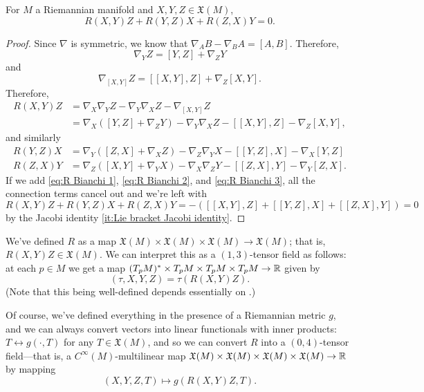 \begin{proposition}\label{prop:Bianchi identity}
	For $M$ a Riemannian manifold and $X,Y,Z \in \mathfrak{X}(M)$,
	\[
		R(X,Y)Z + R(Y,Z)X + R(Z,X)Y = 0.
	\]
\end{proposition}

\begin{proof}
	Since $\nabla$ is symmetric, we know that $\nabla_AB - \nabla_B A = [A,B]$. Therefore, 
	\[
		\nabla_YZ = [Y,Z] + \nabla_ZY
	\]
	and
	\[
		\nabla_{[X,Y]}Z = [[X,Y],Z] + \nabla_Z[X,Y].
	\]
	Therefore,
	\begin{align}\label{eq:R Bianchi 1}
		R(X,Y)Z & = \nabla_X \nabla_Y Z - \nabla_Y \nabla_X Z - \nabla_{[X,Y]}Z \nonumber\\
		& = \nabla_X([Y,Z] + \nabla_ZY) - \nabla_Y \nabla_XZ - [[X,Y],Z] - \nabla_Z[X,Y],
	\end{align}
	and similarly
	\begin{align}
		R(Y,Z)X & = \nabla_Y([Z,X] + \nabla_XZ) - \nabla_Z \nabla_YX - [[Y,Z],X] - \nabla_X[Y,Z] \label{eq:R Bianchi 2} \\
		R(Z,X)Y & = \nabla_Z([X,Y] + \nabla_YX) - \nabla_X \nabla_ZY - [[Z,X],Y] - \nabla_Y[Z,X]. \label{eq:R Bianchi 3}
	\end{align}
	If we add \eqref{eq:R Bianchi 1}, \eqref{eq:R Bianchi 2}, and \eqref{eq:R Bianchi 3}, all the connection terms cancel out and we're left with
	\[
		R(X,Y)Z + R(Y,Z)X + R(Z,X)Y = -([[X,Y],Z] + [[Y,Z],X] + [[Z,X],Y]) = 0
	\]
	by the Jacobi identity \ref{it:Lie bracket Jacobi identity}.
\end{proof}

We've defined $R$ as a map $\mathfrak{X}(M) \times \mathfrak{X}(M) \times \mathfrak{X}(M) \to \mathfrak{X}(M)$; that is, $R(X,Y)Z \in \mathfrak{X}(M)$. We can interpret this as a $(1,3)$-tensor field as follows: at each $p \in M$ we get a map $(T_pM)^\ast \times T_pM \times T_pM \times T_pM \to \mathbb{R}$ given by
\[
	(\tau,X,Y,Z) = \tau(R(X,Y)Z).
\]
(Note that this being well-defined depends essentially on .)

Of course, we've defined everything in the presence of a Riemannian metric $g$, and we can always convert vectors into linear functionals with inner products: $T \leftrightarrow g(\cdot, T)$ for any $T \in \mathfrak{X}(M)$, and so we can convert $R$ into a $(0,4)$-tensor field—that is, a $C^\infty(M)$-multilinear map $\mathfrak{X}(M) \times \mathfrak{X}(M) \times \mathfrak{X}(M) \times \mathfrak{X}(M) \to \mathbb{R}$ by mapping
\[
	(X,Y,Z,T) \mapsto g(R(X,Y)Z,T).
\]

